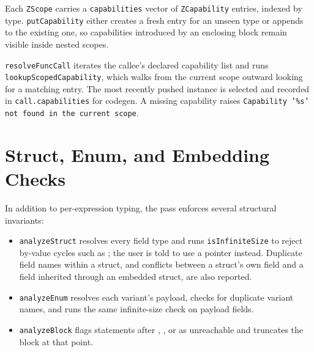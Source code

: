 Each \texttt{ZScope} carries a \texttt{capabilities} vector of
\texttt{ZCapability} entries, indexed by type.
\texttt{putCapability} either creates a fresh entry for an unseen type
or appends to the existing one, so capabilities introduced by an
enclosing  block remain visible inside nested scopes.

\texttt{resolveFuncCall} iterates the callee's declared
capability list and runs \texttt{lookupScopedCapability}, which walks
from the current scope outward looking for a matching entry. The most
recently pushed instance is selected and recorded in
\texttt{call.capabilities} for codegen. A missing capability raises
\texttt{Capability '\%s' not found in the current scope}.

\section{Struct, Enum, and Embedding Checks}

In addition to per-expression typing, the pass enforces several
structural invariants:

\begin{itemize}
  \item \texttt{analyzeStruct} resolves every field type and runs \texttt{isInfiniteSize} to reject by-value cycles such as ; the user is told to use a pointer instead. Duplicate field names within a struct, and conflicts between a struct's own field and a field inherited through an embedded struct, are also reported.
  \item \texttt{analyzeEnum} resolves each variant's payload, checks for duplicate variant names, and runs the same infinite-size check on payload fields.
  \item \texttt{analyzeBlock} flags statements after , , or  as unreachable and truncates the block at that point.
\end{itemize}

